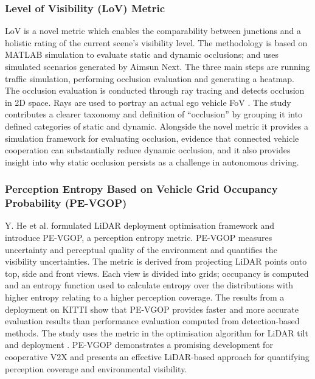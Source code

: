 \documentclass[12pt,a4paper]{article}
\begin{document}
\subsubsection{Level of Visibility (LoV) Metric}

LoV is a novel metric which enables the comparability between junctions
and a holistic rating of the current scene's visibility level. The
methodology is based on MATLAB simulation to evaluate static and dynamic
occlusions; and uses simulated scenarios generated by Aimsun Next. The
three main steps are running traffic simulation, performing occlusion
evaluation and generating a heatmap. The occlusion evaluation is
conducted through ray tracing and detects occlusion in 2D space. Rays
are used to portray an actual ego vehicle FoV
\cite{bib_ref_9}. The study contributes a clearer taxonomy
and definition of ``occlusion'' by grouping it into defined categories of
static and dynamic. Alongside the novel metric it provides a simulation
framework for evaluating occlusion, evidence that connected vehicle
cooperation can substantially reduce dynamic occlusion, and it also
provides insight into why static occlusion persists as a challenge in
autonomous driving.

\subsubsection{Perception Entropy Based on Vehicle Grid Occupancy Probability (PE-VGOP)}

Y. He et al. formulated LiDAR deployment optimisation framework and
introduce PE-VGOP, a perception entropy metric. PE-VGOP measures
uncertainty and perceptual quality of the environment and quantifies the
visibility uncertainties. The metric is derived from projecting LiDAR
points onto top, side and front views. Each view is divided into grids;
occupancy is computed and an entropy function used to calculate entropy
over the distributions with higher entropy relating to a higher
perception coverage. The results from a deployment on KITTI show that
PE-VGOP provides faster and more accurate evaluation results than performance
evaluation computed from detection-based methods. The study uses the
metric in the optimisation algorithm for LiDAR tilt and deployment
\cite{bib_ref_23}. PE-VGOP demonstrates a promising
development for cooperative V2X and presents an effective LiDAR-based
approach for quantifying perception coverage and environmental
visibility.
\end{document}

